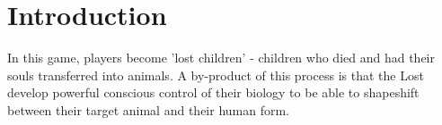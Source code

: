 \documentclass[letterpaper,serif]{rpg-module}
\begin{document}


\maketitle
          
%


\part{Introduction}
\label{introduction}

In this game, players become 'lost children' - children who died and had their souls transferred into animals. A by-product of this process is that the Lost develop powerful conscious control of their biology to be able to shapeshift between their target animal and their human form.  

\end{document}
